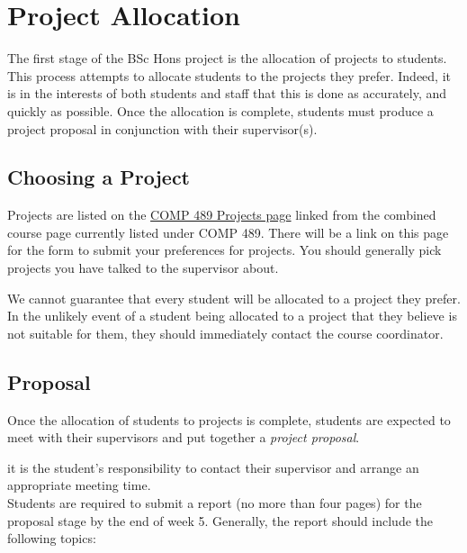 \chapter{Project Allocation}
The first stage of the BSc Hons project is the
allocation of projects to students.  This process attempts to allocate
students to the projects they prefer.  Indeed, it is in the interests
of both students and staff that this is done as accurately, and
quickly as possible.  Once the allocation is complete, students must
produce a project proposal in conjunction with their
supervisor(s).

\section{Choosing a Project}

Projects are listed on the \href{https://ecs.wgtn.ac.nz/Courses/COMP489_2022FY/Projects}{COMP 489 Projects page} linked from the combined course page currently listed under COMP 489. There will be a link on this page for the form to submit your preferences for projects.  
You should generally pick projects you have talked to the supervisor about.

We cannot guarantee that every student will be allocated to a project they
prefer.  In the unlikely event of a student being allocated to a
project that they believe is not suitable for them, they should
immediately contact the course coordinator.

\section{Proposal}

Once the allocation of students to projects is complete, students are
expected to meet with their supervisors and put together a {\em project proposal}.

 it is the student's responsibility to contact their
supervisor and arrange an appropriate meeting time.\\
{Students are required to submit a report (no more than four pages) for the proposal stage by the end of week 5. Generally,
the report should include the following topics:}


